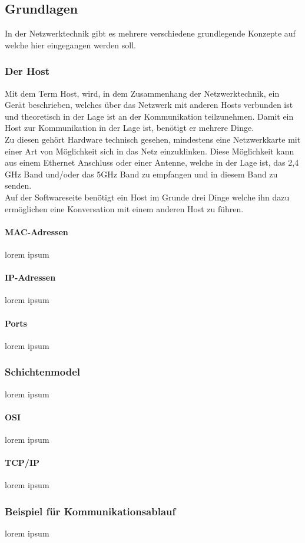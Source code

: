 \documentclass[12pt,a4paper]{report}
\begin{document}
\subsection{Grundlagen}
In der Netzwerktechnik gibt es mehrere verschiedene grundlegende Konzepte auf welche hier eingegangen werden soll.
\subsubsection{Der Host}
Mit dem Term \glqq Host\grqq , wird, in dem Zusammenhang der Netzwerktechnik, ein Gerät beschrieben, welches über das Netzwerk mit anderen Hosts verbunden ist und theoretisch in der Lage ist an der Kommunikation teilzunehmen. Damit ein Host zur Kommunikation in der Lage ist, benötigt er mehrere Dinge.\\
Zu diesen gehört Hardware technisch gesehen, mindestens eine Netzwerkkarte mit einer Art von Möglichkeit sich in das Netz einzuklinken. Diese Möglichkeit kann aus einem Ethernet Anschluss oder einer Antenne, welche in der Lage ist, das 2,4 GHz Band und/oder das 5GHz Band zu empfangen und in diesem Band zu senden.\\
Auf der Softwareseite benötigt ein Host im Grunde drei Dinge welche ihn dazu ermöglichen eine Konversation mit einem anderen Host zu führen.
\paragraph{MAC-Adressen}
lorem ipsum
\paragraph{IP-Adressen}
lorem ipsum
\paragraph{Ports}
lorem ipsum
\subsubsection{Schichtenmodel}
lorem ipsum
\paragraph{OSI}
lorem ipsum
\paragraph{TCP/IP}
lorem ipsum
\subsubsection{Beispiel für Kommunikationsablauf}
lorem ipsum
\end{document}
